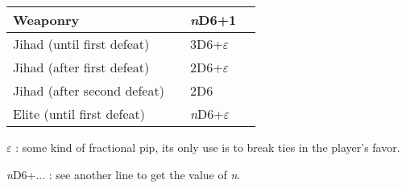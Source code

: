 \documentclass[a4paper,twocolumn]{article}
\newenvironment{texte}{\rmfamily\footnotesize}{}
\newcommand{\eps}[0]{$\varepsilon$}
\begin{document}
\begin{texte}
\begin{tabular}[t]{|p{20mm}|p{20mm}|p{12mm}|p{13mm}|}
\hline
     Weaponry               &                     & \textit{n}D6+1       &                   \\
\hline
 Jihad (until first defeat) &                     &       3D6+\eps       &                   \\
\hline
 Jihad (after first defeat) &                     &       2D6+\eps       &                   \\
\hline
 Jihad (after second defeat) &                     &         2D6          &                   \\
\hline
 Elite (until first defeat)  &                     & \textit{n}D6+\eps    &                   \\
\hline

\end{tabular}

\eps{} : some kind of fractional pip, its only use is to break ties in the player's favor.

\textit{n}D6+... : see another line to get the value of \textit{n}.

\end{texte}
\end{document}
